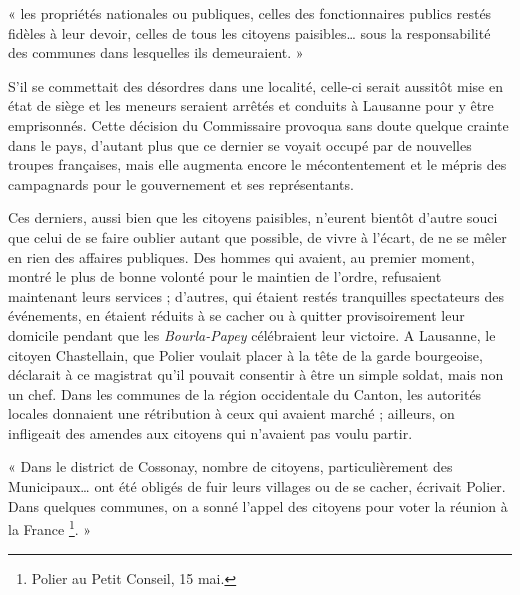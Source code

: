 \documentclass[french,twoside]{book} %
\newenvironment{quoteblock}%
  {\begin{quoting}}
  {\end{quoting}}
\newenvironment{quotebar}{%
    \def\FrameCommand{{\color{rubric!10!}\vrule width 0.5em} \hspace{0.9em}}%
    \def\OuterFrameSep{\itemsep} %
    \MakeFramed {\advance\hsize-\width \FrameRestore}
  }%
  {%
    \endMakeFramed
  }
\renewenvironment{quoteblock}%
  {%
    \savenotes
    \setstretch{0.9}
    \begin{quotebar}
  }
  {%
    \end{quotebar}
    \spewnotes
  }
\begin{document}
\begin{quoteblock}
\noindent « les propriétés nationales ou publiques, celles des fonctionnaires publics restés fidèles à leur devoir, celles de tous les citoyens paisibles… sous la responsabilité des communes dans lesquelles ils demeuraient. »\end{quoteblock}

\noindent S’il se commettait des désordres dans une localité, celle-ci serait aussitôt mise en état de siège et les meneurs seraient arrêtés et conduits à Lausanne pour y être emprisonnés. Cette décision du Commissaire provoqua sans doute quelque crainte dans le pays, d’autant plus que ce dernier se voyait occupé par de nouvelles troupes françaises, mais elle augmenta encore le mécontentement et le mépris des campagnards pour le gouvernement et ses représentants.\par
Ces derniers, aussi bien que les citoyens paisibles, n’eurent bientôt d’autre souci que celui de se faire oublier autant que possible, de vivre à l’écart, de ne se mêler en rien des affaires publiques. Des hommes qui avaient, au premier moment, montré le plus de bonne volonté pour le maintien de l’ordre, refusaient maintenant leurs services ; d’autres, qui étaient restés tranquilles spectateurs des événements, en étaient réduits à se cacher ou à quitter provisoirement leur domicile pendant que les \emph{Bourla-Papey} célébraient leur victoire. A Lausanne, le citoyen Chastellain, que Polier voulait placer à la tête de la garde bourgeoise, déclarait à ce magistrat qu’il pouvait consentir à être un simple soldat, mais non un chef. Dans les communes de la région occidentale du Canton, les autorités locales donnaient une rétribution à ceux qui avaient marché ; ailleurs, on infligeait des amendes aux citoyens qui n’avaient pas voulu partir.\par

\begin{quoteblock}
 \noindent « Dans le district de Cossonay, nombre de citoyens, particulièrement des Municipaux… ont été obligés de fuir leurs villages ou de se cacher, écrivait Polier. Dans quelques communes, on a sonné l’appel des citoyens pour voter la réunion à la France \footnote{Polier au Petit Conseil, 15 mai.}. »
 \end{quoteblock}
\end{document}
